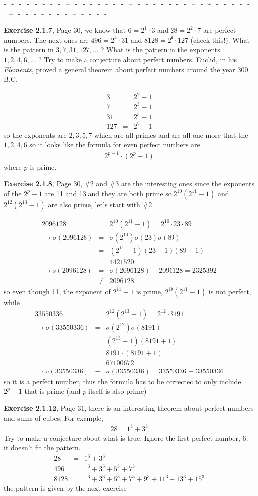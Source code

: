 \documentclass[aps,preprint,preprintnumbers,nofootinbib,showpacs,prd]{revtex4-1}
\newcommand{\nbea}{\begin{eqnarray*}}
\newcommand{\neea}{\end{eqnarray*}}
\begin{document}
-=-=-=-=-=-=-=-=--=-=-=-=-=-=-=-=--=-=-=-=-=-=-=-=--=-=-=-=-=-=-=-=--=-=-=-=-=-=-=-=--=-=-=-=-=

{\bf Exercise 2.1.7}, Page 30, we know that $6=2^1\cdot3$ and $28=2^2\cdot 7$ are perfect numbers. The next ones are $496=2^4\cdot31$ and $8128=2^6\cdot127$ (check this!). What is the pattern in $3,7,31,127,\ldots$ ? What is the pattern in the exponents $1,2,4,6,\ldots$ ? Try to make a conjecture about perfect numbers. Euclid, in his {\it Elements}, proved a general theorem about perfect numbers around the year 300 B.C.

%
\nbea
3 & = & 2^2 - 1 \\
7 & = & 2^3 - 1 \\
31 & = & 2^5 - 1\\
127 & = & 2^7 - 1
\neea
%
so the exponents are $2,3,5,7$ which are all primes and are all one more that the $1,2,4,6$ so it looks like the formula for even perfect numbers are
%
\nbea
2^{p-1}\cdot (2^p - 1)
\neea
%
where $p$ is prime.

{\bf Exercise 2.1.8}, Page 30, \#2 and \#3 are the interesting ones since the exponents of the $2^p-1$ are 11 and 13 and they are both prime so $2^{10}(2^{11}-1)$ and $2^{12}(2^{13}-1)$ are also prime, let's start with \#2

%
\nbea
2096128 & = & 2^{10}(2^{11}-1) = 2^{10}\cdot 23 \cdot 89 \\
\to \sigma(2096128) & = & \sigma(2^{10}) \sigma(23) \sigma(89) \\
& = & (2^{11}-1) (23+1)(89+1) \\
& = & 4421520 \\
\to s(2096128) & = & \sigma(2096128) - 2096128  = 2325392\\
& \neq & 2096128
\neea
%
so even though 11, the exponent of $2^{11}-1$ is prime, $2^{10}(2^{11}-1)$ is not perfect, while
%
\nbea
33550336 & = & 2^{12}(2^{13}-1) = 2^{12} \cdot 8191 \\
\to \sigma(33550336) & = & \sigma(2^{12})\sigma(8191) \\
& = & (2^{13}-1)(8191+1) \\
& = & 8191\cdot(8191+1) \\
& = & 67100672 \\
\to s(33550336) & = & \sigma(33550336) - 33550336 = 33550336
\neea
%
so it is a perfect number, thus the formula has to be correctec to only include $2^p-1$ that is prime (and $p$ itself is also prime)

{\bf Exercise 2.1.12}, Page 31, there is an interesting theorem about perfect numbers and sums of cubes. For example,
%
\nbea
28 = 1^3 + 3^3
\neea
%
Try to make a conjecture about what is true. Ignore the first perfect number, 6; it doesn't fit the pattern.
%
\nbea
28 & = & 1^3 + 3^3\\
496 & = & 1^3 + 3^3 + 5^3 + 7^3\\
8128 & = & 1^3 + 3^3 + 5^3 + 7^3 + 9^3 + 11^3 + 13^3 + 15^3
\neea
%
the pattern is given by the next exercise
\end{document}

